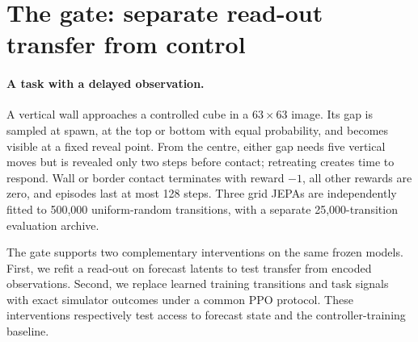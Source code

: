 \section{The gate: separate read-out transfer from control}
\label{sec:controllers}

\paragraph{A task with a delayed observation.}
A vertical wall approaches a controlled cube in a $63\times63$ image. Its gap is sampled at spawn,
at the top or bottom with equal probability, and becomes visible at a fixed reveal point. From the
centre, either gap needs five vertical moves but is revealed only two steps before contact;
retreating creates time to respond. Wall or border contact terminates with reward $-1$, all other
rewards are zero, and episodes last at most 128 steps. Three grid JEPAs are independently fitted to
500,000 uniform-random transitions, with a separate 25,000-transition evaluation archive.

The gate supports two complementary interventions on the same frozen models. First, we refit a
read-out on forecast latents to test transfer from encoded observations. Second, we replace learned
training transitions and task signals with exact simulator outcomes under a common PPO protocol.
These interventions respectively test access to forecast state and the controller-training baseline.
